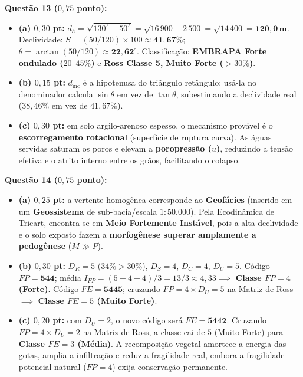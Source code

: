 \begin{boxGabarito}
  \textbf{Questão 13 ($0{,}75$ ponto):}
  \begin{itemize}[leftmargin=1.5em, itemsep=2.5pt]
    \item \textbf{(a) $0{,}30$ pt:} $d_h = \sqrt{130^2 - 50^2} = \sqrt{16\,900 - 2\,500} = \sqrt{14\,400} = \mathbf{120{,}0\,\text{m}}$. Declividade: $S = (50 / 120) \times 100 \approx \mathbf{41{,}67\%}$; $\theta = \arctan(50 / 120) \approx \mathbf{22{,}62^\circ}$. Classificação: \textbf{EMBRAPA Forte ondulado ($20\text{--}45\%$)} e \textbf{Ross Classe 5, Muito Forte ($>30\%$)}.
    \item \textbf{(b) $0{,}15$ pt:} $d_{\text{inc}}$ é a hipotenusa do triângulo retângulo; usá-la no denominador calcula $\sin\theta$ em vez de $\tan\theta$, subestimando a declividade real ($38{,}46\%$ em vez de $41{,}67\%$).
    \item \textbf{(c) $0{,}30$ pt:} em solo argilo-arenoso espesso, o mecanismo provável é o \textbf{escorregamento rotacional} (superfície de ruptura curva). As águas servidas saturam os poros e elevam a \textbf{poropressão ($u$)}, reduzindo a tensão efetiva e o atrito interno entre os grãos, facilitando o colapso.
  \end{itemize}
  \vspace{4pt}
  \textbf{Questão 14 ($0{,}75$ ponto):}
  \begin{itemize}[leftmargin=1.5em, itemsep=2.5pt]
    \item \textbf{(a) $0{,}25$ pt:} a vertente homogênea corresponde ao \textbf{Geofácies} (inserido em um \textbf{Geossistema} de sub-bacia/escala $1:50.000$). Pela Ecodinâmica de Tricart, encontra-se em \textbf{Meio Fortemente Instável}, pois a alta declividade e o solo exposto fazem a \textbf{morfogênese superar amplamente a pedogênese} ($M \gg P$).
    \item \textbf{(b) $0{,}30$ pt:} $D_R = 5$ ($34\% > 30\%$), $D_S = 4$, $D_C = 4$, $D_U = 5$. Código $FP = \mathbf{544}$; média $I_{FP} = (5+4+4)/3 = 13/3 \approx 4{,}33 \implies$ \textbf{Classe $FP = 4$ (Forte)}. Código $FE = \mathbf{5445}$; cruzando $FP=4 \times D_U=5$ na Matriz de Ross $\implies$ \textbf{Classe $FE = 5$ (Muito Forte)}.
    \item \textbf{(c) $0{,}20$ pt:} com $D_U = 2$, o novo código será $FE = \mathbf{5442}$. Cruzando $FP=4 \times D_U=2$ na Matriz de Ross, a classe cai de $5$ (Muito Forte) para \textbf{Classe $FE = 3$ (Média)}. A recomposição vegetal amortece a energia das gotas, amplia a infiltração e reduz a fragilidade real, embora a fragilidade potencial natural ($FP=4$) exija conservação permanente.
  \end{itemize}
\end{boxGabarito}


